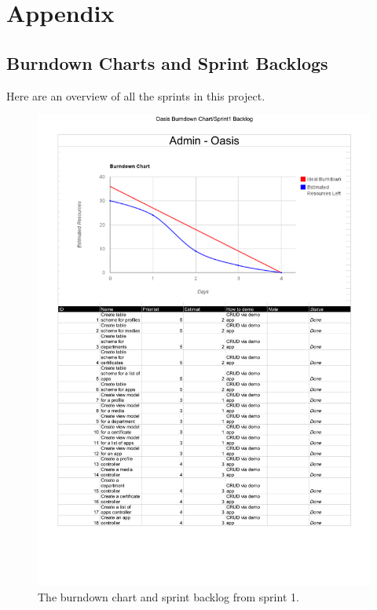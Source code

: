 \chapter*{Appendix}

\section{Burndown Charts and Sprint Backlogs}
\label{sec:burn_back}
Here are an overview of all the sprints in this project.
	
\begin{figure}[htbp]
	\centering
		\includegraphics[width=\textwidth]{Images/sprint_backlogs/Oasis Burndown Chart - Sprint1 Backlog}
	\caption{The burndown chart and sprint backlog from sprint 1.}
	\label{fig:sprint1}
\end{figure}

